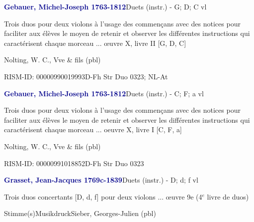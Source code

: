 \documentclass[twocolumn]{book}
\begin{document}
\par \vspace{7pt} \textcolor{darkblue}{\textbf{Gebauer, Michel-Joseph  1763-1812}}\hfillplus{\textbf{[277]}}\newline Duets (instr.) - G; D; C vl
\par \begin{itshape}Trois duos pour deux violons à l'usage des commençans avec des notices pour faciliter aux élèves le moyen de retenir et observer les différentes instructions qui caractérisent chaque morceau ... œuvre X, livre II [G, D, C]\end{itshape} \newline Nolting, W. C., Vve \& fils  (pbl)
\par RISM-ID: 00000990019993\newline D-Fh  Str Duo 0323; NL-At
\par \vspace{7pt} \textcolor{darkblue}{\textbf{Gebauer, Michel-Joseph  1763-1812}}\hfillplus{\textbf{[278]}}\newline Duets (instr.) - C; F; a vl
\par \begin{itshape}Trois duos pour deux violons à l'usage des commençans avec des notices pour faciliter aux élèves le moyen de retenir et observer les différentes instructions qui caractérisent chaque morceau ... oeuvre X, livre I [C, F, a]\end{itshape} \newline Nolting, W. C., Vve \& fils  (pbl)
\par RISM-ID: 00000991018852\newline D-Fh  Str Duo 0323
\par \vspace{7pt} \textcolor{darkblue}{\textbf{Grasset, Jean-Jacques  1769c-1839}}\hfillplus{\textbf{[279]}}\newline Duets (instr.) - D; d; f vl
\par \begin{itshape}Trois duos concertants [D, d, f] pour deux violons ... œuvre 9e (4$^e$ livre de duos)\end{itshape} 
\par \textcolor{darkblue}{}  Stimme(s)\newline Musikdruck\newline Sieber, Georges-Julien  (pbl)
\end{document}
